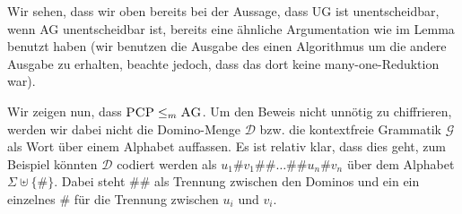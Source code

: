 \documentclass[11pt, a4paper]{article}
\theoremstyle{definition}
\theoremstyle{plain}
\begin{document}
Wir sehen, dass wir oben bereits bei der Aussage, dass \textsc{UG} ist unentscheidbar, wenn \textsc{AG} unentscheidbar ist, bereits eine ähnliche Argumentation wie im Lemma benutzt haben (wir benutzen die Ausgabe des einen Algorithmus um die andere Ausgabe zu erhalten, beachte jedoch, dass das dort keine many-one-Reduktion war).

Wir zeigen nun, dass $\textsc{PCP} \leq_m \textsc{AG}$. Um den Beweis nicht unnötig zu chiffrieren, werden wir dabei nicht die Domino-Menge $\mathcal{D}$ bzw. die kontextfreie Grammatik $\mathcal{G}$ als Wort über einem Alphabet auffassen. Es ist relativ klar, dass dies geht, zum Beispiel könnten $\mathcal{D}$ codiert werden als $u_1\#v_1\#\#\ldots\#\#u_n\#v_n$ über dem Alphabet $\Sigma \uplus \{\#\}$. Dabei steht $\#\#$ als Trennung zwischen den Dominos und ein ein einzelnes $\#$ für die Trennung zwischen $u_i$ und $v_i$.
\end{document}
